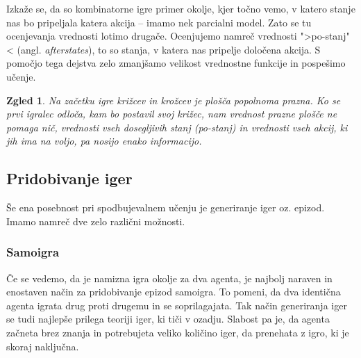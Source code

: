 \documentclass[12pt,a4paper]{amsart}
\theoremstyle{definition} %
\theoremstyle{plain} %
\newtheorem{zgled}[definicija]{Zgled}
\begin{document}
Izkaže se, da so kombinatorne igre primer okolje, kjer točno vemo, v katero stanje nas bo pripeljala 
katera akcija -- imamo nek parcialni model. Zato se tu ocenjevanja vrednosti lotimo drugače. Ocenjujemo 
namreč vrednosti ">po-stanj"< (angl. \textit{afterstates}), to so stanja, v katera nas pripelje 
določena akcija. S pomočjo tega dejstva zelo zmanjšamo velikost vrednostne funkcije in pospešimo učenje.

\begin{zgled}
    Na začetku igre križcev in krožcev je plošča popolnoma prazna. Ko se prvi igralec odloča, kam bo 
    postavil svoj križec, nam vrednost prazne plošče ne pomaga nič, vrednosti vseh dosegljivih stanj 
    (po-stanj) in vrednosti vseh akcij, ki jih ima na voljo, pa nosijo enako informacijo.
\end{zgled}

\subsection{Pridobivanje iger}
Še ena posebnost pri spodbujevalnem učenju je generiranje iger oz. epizod. Imamo namreč dve zelo 
različni možnosti. 

\subsubsection{Samoigra}
Če se vedemo, da je namizna igra okolje za dva agenta, je najbolj naraven in enostaven način za 
pridobivanje epizod samoigra. To pomeni, da dva identična agenta igrata drug proti drugemu in se 
soprilagajata. Tak način generiranja iger se tudi najlepše prilega teoriji iger, ki tiči v ozadju. 
Slabost pa je, da agenta začneta brez znanja in potrebujeta veliko količino iger, da prenehata z 
igro, ki je skoraj naključna.
\end{document}
